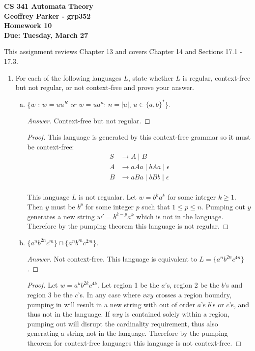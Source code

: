 \documentclass[10pt]{article}
\newcommand{\card}[1]{\left| #1 \right|}
\begin{document}
\begin{flushleft}
\textbf{\noindent
CS 341 Automata Theory \\
Geoffrey Parker - grp352 \\
Homework 10 \\
Due: Tuesday, March 27}\\
\end{flushleft}
\noindent
This assignment reviews Chapter 13 and covers Chapter 14 and Sections 17.1 - 17.3. \\

\begin{enumerate}[1)]


\item
For each of the following languages $L$, state whether $L$ is regular, context-free but not regular, or not context-free and prove your answer.
\begin{enumerate}[a)]
\item
\{$w$ : $w = uu^R$ or $w = ua^n$: $n = \card{u}$, $u \in \{a, b\}^*$\}.
\begin{proof}[Answer]
Context-free but not regular.
\end{proof}
\begin{proof}[Proof]
This language is generated by this context-free grammar so it must be context-free:
\begin{align*}
S &\rightarrow A \mid B\\
A &\rightarrow aAa \mid bAa \mid \epsilon\\
B &\rightarrow aBa \mid bBb \mid \epsilon
\end{align*}\\
This language $L$ is not regualar.  Let $w = b^ka^k$ for some integer $k \geq 1$.  Then $y$ must be $b^p$ for some integer $p$ such that $1 \leq p \leq n$.  Pumping out $y$ generates a new string $w' = b^{k-p}a^k$ which is not in the language.  Therefore by the pumping theorem this language is not regular.
\end{proof}

\item
$\{a^nb^{2n}c^m\} \cap \{a^nb^mc^{2m}\}$.
\begin{proof}[Answer]
Not context-free.  This language is equivalent to $L = \{a^nb^{2n}c^{4n}\}$.
\end{proof}
\begin{proof}[Proof]
Let $w = a^kb^{2k}c^{4k}$.  Let region 1 be the $a$'s, region 2 be the $b$'s and region 3 be the $c$'s.  In any case where $vxy$ crosses a region boundry, pumping in will result in a new string with out of order $a$'s $b$'s or $c$'s, and thus not in the language.  If $vxy$ is contained solely within a region, pumping out will disrupt the cardinality requirement, thus also generating a string not in the language.  Therefore by the pumping theorem for context-free languages this language is not context-free.
\end{proof}


\end{enumerate}
\end{enumerate}
\end{document}
